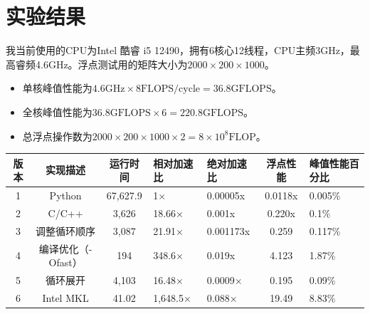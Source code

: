 \documentclass{SYSUReport}
\begin{document}
\section{实验结果}

我当前使用的CPU为Intel 酷睿 i5 12490，拥有6核心12线程，CPU主频3GHz，最高睿频4.6GHz。浮点测试用的矩阵大小为$2000 \times 200 \times 1000$。
\begin{itemize}
    \item 单核峰值性能为$4.6\text{GHz} \times 8 \text{FLOPS/cycle} = 36.8\text{GFLOPS}$。
    \item 全核峰值性能为$36.8\text{GFLOPS} \times 6 = 220.8\text{GFLOPS}$。
    \item 总浮点操作数为$2000 \times 200 \times 1000 \times 2 = 8 \times 10^8\text{FLOP}$。
\end{itemize}

\begin{table}[H]
    \centering
    \begin{tabular}{|c|c|c|p{1.5cm}|p{1.5cm}|c|p{2cm}|}
        \hline
        版本 & 实现描述 & 运行时间& 相对加速比 & 绝对加速比 & 浮点性能 & 峰值性能百分比 \\
        \hline
        1 & Python & 67,627.9 & 1× & 0.00005x & 0.0118x & 0.005\% \\ 
        \hline
        2 & C/C++ & 3,626 & 18.66× & 0.001x & 0.220x & 0.1\% \\ 
        \hline
        3 & 调整循环顺序 & 3,087 & 21.91× & 0.001173x & 0.259 & 0.117\% \\ 
        \hline
        4 & 编译优化（-Ofast） & 194 & 348.6× & 0.019x & 4.123 & 1.87\% \\ 
        \hline
        5 & 循环展开 & 4,103 & 16.48× & 0.0009× & 0.195 & 0.09\% \\ 
        \hline
        6 & Intel MKL & 41.02 & 1,648.5× & 0.088× & 19.49 & 8.83\% \\ 
        \hline
    \end{tabular}
\end{table}
\end{document}
